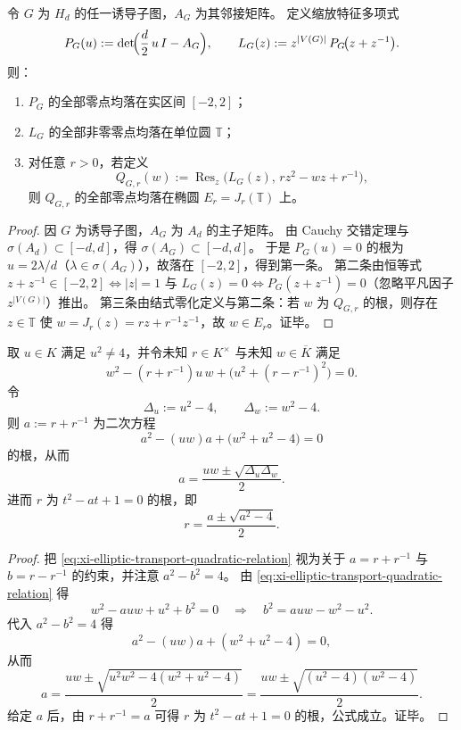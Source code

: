 \begin{proposition}\label{prop:xi-induced-subgraph-leyang-to-elliptic-closure}
令 \(G\) 为 \(H_d\) 的任一诱导子图，\(A_G\) 为其邻接矩阵。
定义缩放特征多项式
\[
P_G(u):=\det\!\Bigl(\frac d2\,u\,I-A_G\Bigr),
\qquad
L_G(z):=z^{|V(G)|}\,P_G\!\bigl(z+z^{-1}\bigr).
\]
则：
\begin{enumerate}
  \item \(P_G\) 的全部零点均落在实区间 \([-2,2]\)；
  \item \(L_G\) 的全部非零零点均落在单位圆 \(\mathbb T\)；
  \item 对任意 \(r>0\)，若定义
  \[
  Q_{G,r}(w):=\operatorname{Res}_z\!\bigl(L_G(z),\,rz^2-wz+r^{-1}\bigr),
  \]
  则 \(Q_{G,r}\) 的全部零点均落在椭圆 \(E_r=J_r(\mathbb T)\) 上。
\end{enumerate}
\end{proposition}
\begin{proof}
因 \(G\) 为诱导子图，\(A_G\) 为 \(A_d\) 的主子矩阵。
由 Cauchy 交错定理与 \(\sigma(A_d)\subset[-d,d]\)，得 \(\sigma(A_G)\subset[-d,d]\)。
于是 \(P_G(u)=0\) 的根为 \(u=2\lambda/d\)（\(\lambda\in\sigma(A_G)\)），故落在 \([-2,2]\)，得到第一条。
第二条由恒等式
\(
z+z^{-1}\in[-2,2]\iff |z|=1
\)
与 \(L_G(z)=0\iff P_G(z+z^{-1})=0\)（忽略平凡因子 \(z^{|V(G)|}\)）推出。
第三条由结式零化定义与第二条：若 \(w\) 为 \(Q_{G,r}\) 的根，则存在 \(z\in\mathbb T\) 使 \(w=J_r(z)=rz+r^{-1}z^{-1}\)，故 \(w\in E_r\)。证毕。
\end{proof}

\begin{theorem}[单个非退化椭圆零点对尺度参数的代数可逆性]\label{thm:xi-single-elliptic-zero-reconstructs-scale}
取 \(u\in K\) 满足 \(u^2\neq 4\)，并令未知 \(r\in K^{\times}\) 与未知 \(w\in\overline K\) 满足
\begin{equation}\label{eq:xi-elliptic-transport-quadratic-relation}
w^2-(r+r^{-1})u\,w+\bigl(u^2+(r-r^{-1})^2\bigr)=0.
\end{equation}
令
\[
\Delta_u:=u^2-4,\qquad \Delta_w:=w^2-4.
\]
则 \(a:=r+r^{-1}\) 为二次方程
\[
a^2-(uw)a+\bigl(w^2+u^2-4\bigr)=0
\]
的根，从而
\[
a=\frac{uw\pm\sqrt{\Delta_u\Delta_w}}{2}.
\]
进而 \(r\) 为
\(
t^2-a t+1=0
\)
的根，即
\[
r=\frac{a\pm\sqrt{a^2-4}}{2}.
\]
\end{theorem}
\begin{proof}
把 \eqref{eq:xi-elliptic-transport-quadratic-relation} 视为关于
\(
a=r+r^{-1}
\)
与
\(
b=r-r^{-1}
\)
的约束，并注意 \(a^2-b^2=4\)。
由 \eqref{eq:xi-elliptic-transport-quadratic-relation} 得
\[
w^2-auw+u^2+b^2=0
\quad\Rightarrow\quad
b^2=auw-w^2-u^2.
\]
代入 \(a^2-b^2=4\) 得
\[
a^2-(uw)a+(w^2+u^2-4)=0,
\]
从而
\[
a=\frac{uw\pm\sqrt{u^2w^2-4(w^2+u^2-4)}}{2}
=\frac{uw\pm\sqrt{(u^2-4)(w^2-4)}}{2}.
\]
给定 \(a\) 后，由 \(r+r^{-1}=a\) 可得 \(r\) 为 \(t^2-a t+1=0\) 的根，公式成立。证毕。
\end{proof}

